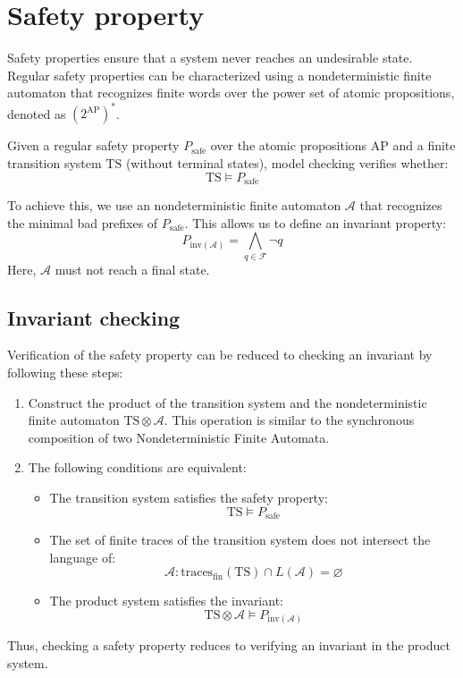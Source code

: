 \section{Safety property}

Safety properties ensure that a system never reaches an undesirable state. 
Regular safety properties can be characterized using a nondeterministic finite automaton that recognizes finite words over the power set of atomic propositions, denoted as $\left(2^{\text{AP}}\right)^\ast$.

\begin{definition}
    Given a regular safety property $P_{\text{safe}}$ over the atomic propositions $\text{AP}$ and a finite transition system $\text{TS}$ (without terminal states), model checking verifies whether:
    \[\text{TS}\models P_{\text{safe}}\]
\end{definition}
\noindent 
To achieve this, we use an nondeterministic finite automaton $\mathcal{A}$ that recognizes the minimal bad prefixes of $P_{\text{safe}}$.
This allows us to define an invariant property:
\[P_{\text{inv}(\mathcal{A})}=\bigwedge_{q\in\mathcal{F}}\lnot q\]
Here, $\mathcal{A}$ must not reach a final state.

\subsection{Invariant checking}
Verification of the safety property can be reduced to checking an invariant by following these steps:
\begin{enumerate}
    \item Construct the product of the transition system and the nondeterministic finite automaton $\text{TS}\otimes \mathcal{A}$. 
        This operation is similar to the synchronous composition of two Nondeterministic Finite Automata.
    \item The following conditions are equivalent:
        \begin{itemize}
            \item The transition system satisfies the safety property: 
                \[\text{TS} \models P_{\text{safe}}\]
            \item The set of finite traces of the transition system does not intersect the language of:
                \[\mathcal{A}: \text{traces}_{\text{fin}}(\text{TS}) \cap L(\mathcal{A}) = \varnothing\]
            \item The product system satisfies the invariant:
                \[\text{TS}\otimes \mathcal{A} \models P_{\text{inv}(\mathcal{A})}\]
        \end{itemize}
\end{enumerate}
\noindent Thus, checking a safety property reduces to verifying an invariant in the product system.

